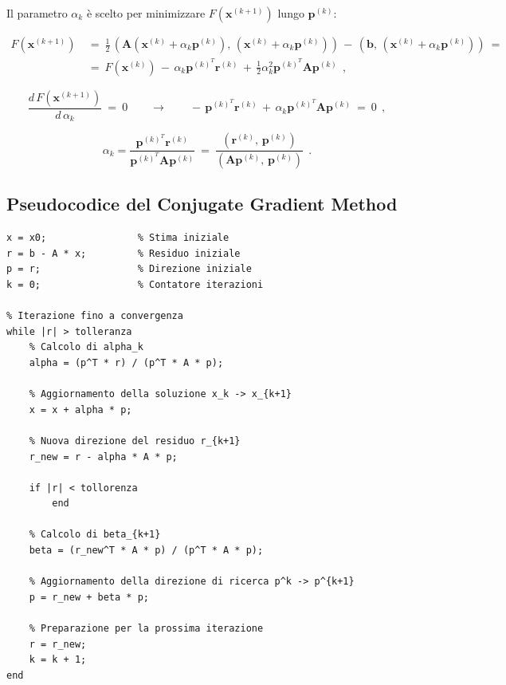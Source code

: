 Il parametro \(\alpha_k\) è scelto per minimizzare \(F(\mathbf{x}^{(k+1)})\) lungo \(\mathbf{p}^{(k)}\):

\[\begin{aligned}
F(\mathbf{x}^{(k+1)})\ &=\ 
\frac{1}{2}\, (\mathbf A (\mathbf x^{(k)}+\alpha_k \mathbf p^{(k)}),\, (\mathbf x^{(k)}+\alpha_k \mathbf p^{(k)}))\, -\, (\mathbf b, \, (\mathbf x^{(k)}+\alpha_k \mathbf p^{(k)}))\ =\\
&=\ F(\mathbf x^{(k)})\, -\, \alpha_k \mathbf p^{(k)^T} \mathbf r^{(k)}\, +\, \frac{1}{2}\alpha_k^2 \mathbf{p}^{(k)^T} \mathbf A \mathbf p^{(k)}\ \ ,
\end{aligned}\]

\[
\frac{d\, F(\mathbf x^{(k+1)})}{d\, \alpha_k}\ =\ 0
\qquad \rightarrow \qquad
-\, \mathbf p^{(k)^T} \mathbf{r}^{(k)}\, +\, \alpha_k \mathbf{p}^{(k)^T} \mathbf A \mathbf p^{(k)}\ =\ 0\ \ ,
\]

\begin{equation*}
	\alpha_k = \frac{\mathbf{p}^{(k)^T} \mathbf{r}^{(k)}}{\mathbf{p}^{(k)^T} \mathbf{A} \mathbf{p}^{(k)}}\ =\ 
	\frac{(\mathbf{r}^{(k)},\, \mathbf{p}^{(k)})}{(\mathbf{A} \mathbf{p}^{(k)},\, \mathbf{p}^{(k)})}\ \ .
\end{equation*}


\subsection*{Pseudocodice del Conjugate Gradient Method}

\begin{lstlisting}[caption={Implementazione del CGM}]
% Inizializzazione
x = x0;                % Stima iniziale
r = b - A * x;         % Residuo iniziale
p = r;                 % Direzione iniziale
k = 0;                 % Contatore iterazioni
		
% Iterazione fino a convergenza
while |r| > tolleranza
	% Calcolo di alpha_k
	alpha = (p^T * r) / (p^T * A * p);
			
	% Aggiornamento della soluzione x_k -> x_{k+1}
	x = x + alpha * p;
			
	% Nuova direzione del residuo r_{k+1}
	r_new = r - alpha * A * p;
			
	if |r| < tollorenza
		end
			
	% Calcolo di beta_{k+1}
	beta = (r_new^T * A * p) / (p^T * A * p);
			
	% Aggiornamento della direzione di ricerca p^k -> p^{k+1}
	p = r_new + beta * p;
			
	% Preparazione per la prossima iterazione
	r = r_new;
	k = k + 1;
end
\end{lstlisting}


